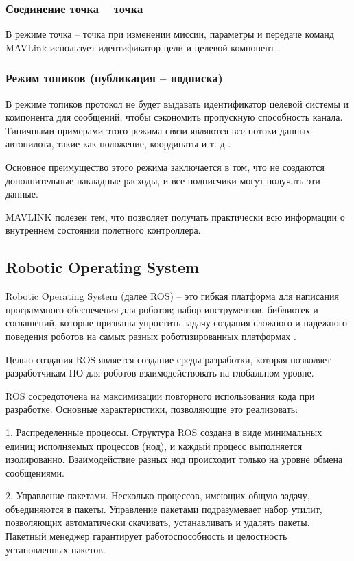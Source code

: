 \subsubsection{Соединение точка -- точка}
В режиме точка -- точка при изменении миссии, параметры и передаче команд MAV\-Link использует идентификатор цели и целевой компонент \cite{mavlink}.

\subsubsection{Режим топиков (публикация -- подписка)}
В режиме топиков протокол не будет выдавать идентификатор целевой системы и компонента для сообщений, чтобы сэкономить пропускную способность канала. Типичными примерами этого режима связи являются все потоки данных автопилота, такие как положение, координаты и т. д \cite{mavlink}.

Основное преимущество этого режима заключается в том, что не создаются дополнительные накладные расходы, и все подписчики могут получать эти данные.

MAVLINK полезен тем, что позволяет получать практически всю информации о внутреннем состоянии полетного контроллера.

\subsection{Robotic Operating System}

Robotic Operating System (далее ROS) -- это гибкая платформа для написания программного обеспечения для роботов; набор инструментов, библиотек и соглашений, которые призваны упростить задачу создания сложного и надежного поведения роботов на самых разных роботизированных платформах \cite{ros}.

Целью создания ROS является создание среды разработки, которая позволяет разработчикам ПО для роботов взаимодействовать на глобальном уровне.

ROS сосредоточена на максимизации повторного использования кода при разработке. Основные характеристики, позволяющие это реализовать:

1. Распределенные процессы. Структура ROS создана в виде минимальных единиц исполняемых процессов (нод), и каждый процесс выполняется изолированно. Взаимодействие разных нод происходит только на уровне обмена сообщениями.

2. Управление пакетами. Несколько процессов, имеющих общую задачу, объединяются в пакеты. Управление пакетами подразумевает набор утилит, позволяющих автоматически скачивать, устанавливать и удалять пакеты. Пакетный менеджер гарантирует работоспособность и целостность установленных пакетов.

